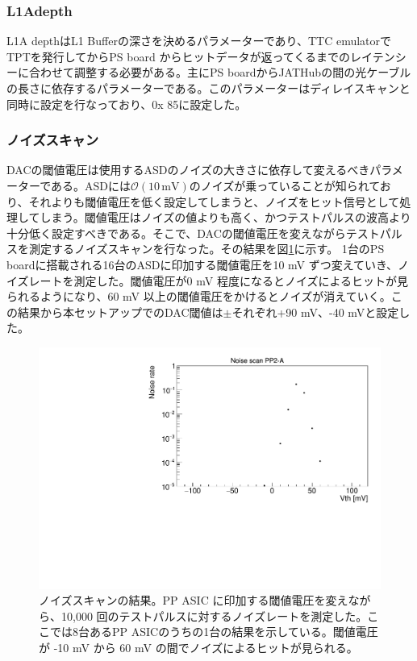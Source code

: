 \subsubsection{L1Adepth}
L1A depthはL1 Bufferの深さを決めるパラメーターであり、TTC emulatorでTPTを発行してからPS board からヒットデータが返ってくるまでのレイテンシーに合わせて調整する必要がある。主にPS boardからJATHubの間の光ケーブルの長さに依存するパラメーターである。このパラメーターはディレイスキャンと同時に設定を行なっており、0x 85に設定した。
\baselineskip

\subsubsection{ノイズスキャン}
DACの閾値電圧は使用するASDのノイズの大きさに依存して変えるべきパラメーターである。ASDには$\mathcal{O}(10 \,\mathrm{mV})$のノイズが乗っていることが知られており、それよりも閾値電圧を低く設定してしまうと、ノイズをヒット信号として処理してしまう。閾値電圧はノイズの値よりも高く、かつテストパルスの波高より十分低く設定すべきである。そこで、DACの閾値電圧を変えながらテストパルスを測定するノイズスキャンを行なった。その結果を図\ref{QAQCnoisescan}に示す。
1台のPS boardに搭載される16台のASDに印加する閾値電圧を10 mV ずつ変えていき、ノイズレートを測定した。閾値電圧が0 mV 程度になるとノイズによるヒットが見られるようになり、60 mV 以上の閾値電圧をかけるとノイズが消えていく。この結果から本セットアップでのDAC閾値は$\pm$それぞれ+90 mV、-40 mVと設定した。
\baselineskip

\begin{figure} 
\centering
\includegraphics[width=16cm]{fig/QAQC/noise_A2.pdf}
\caption[ノイズスキャンの結果]{ノイズスキャンの結果。PP ASIC に印加する閾値電圧を変えながら、10,000 回のテストパルスに対するノイズレートを測定した。ここでは8台あるPP ASICのうちの1台の結果を示している。閾値電圧が -10 mV から 60 mV の間でノイズによるヒットが見られる。}
\label{QAQCnoisescan}
\end{figure}

